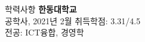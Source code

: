 \documentclass{resume} %
\begin{document}

\begin{rSection}{학력사항}
{\bf 한동대학교} \hfill 
\\  공학사, 2021년 2월 \hfill { 취득학점: 3.31/4.5}
\\ 전공: ICT융합, 경영학


\end{rSection}
\end{document}
